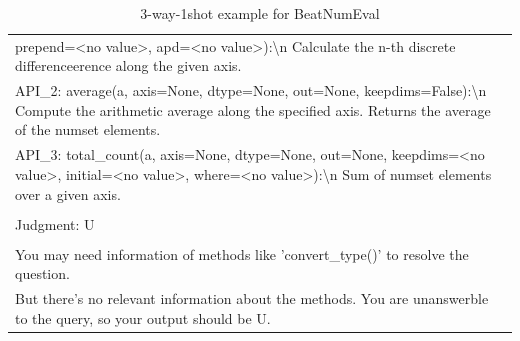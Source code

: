 \begin{table}[t!]
\begin{tabularx}{\textwidth}{|X|}
prepend=\textless{}no value\textgreater{}, apd=\textless{}no value\textgreater{}):\textbackslash{}n    Calculate the n-th discrete differenceerence along the given axis.\\ API\_2: average(a, axis=None, dtype=None, out=None, keepdims=False):\textbackslash{}n    Compute the arithmetic average along the specified axis. Returns the average of the numset elements.\\ API\_3: total\_count(a, axis=None, dtype=None, out=None, keepdims=\textless{}no value\textgreater{}, initial=\textless{}no value\textgreater{}, where=\textless{}no value\textgreater{}):\textbackslash{}n    Sum of numset elements over a given axis.\\ \\ Judgment: U\\ \\ You may need information of methods like 'convert\_type()' to resolve the question.\\ But there's no relevant information about the methods. You are unanswerble to the query, so your output should be U. \\ \hline
\end{tabularx}
\caption{3-way-1shot example for BeatNumEval}
\label{tab:2shot_prompt_beatnumeval}
\end{table}